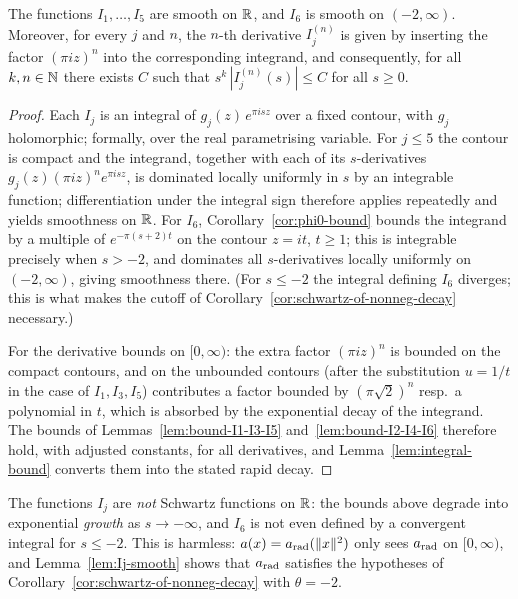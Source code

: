 \begin{lemma}\label{lem:Ij-smooth}
    The functions $I_1, \ldots, I_5$ are smooth on $\mathbb{R}$, and $I_6$ is smooth on $(-2, \infty)$. Moreover, for every $j$ and $n$, the $n$-th derivative $I_j^{(n)}$ is given by inserting the factor $(\pi i z)^n$ into the corresponding integrand, and consequently, for all $k, n \in \mathbb{N}$ there exists $C$ such that $s^k\, |I_j^{(n)}(s)| \leq C$ for all $s \geq 0$.
\end{lemma}
\begin{proof}
    Each $I_j$ is an integral of $g_j(z)\, e^{\pi i s z}$ over a fixed contour, with $g_j$ holomorphic; formally, over the real parametrising variable. For $j \leq 5$ the contour is compact and the integrand, together with each of its $s$-derivatives $g_j(z) (\pi i z)^n e^{\pi i s z}$, is dominated locally uniformly in $s$ by an integrable function; differentiation under the integral sign therefore applies repeatedly and yields smoothness on $\mathbb{R}$. For $I_6$, Corollary~\ref{cor:phi0-bound} bounds the integrand by a multiple of $e^{-\pi(s+2)t}$ on the contour $z = it$, $t \geq 1$; this is integrable precisely when $s > -2$, and dominates all $s$-derivatives locally uniformly on $(-2, \infty)$, giving smoothness there. (For $s \leq -2$ the integral defining $I_6$ diverges; this is what makes the cutoff of Corollary~\ref{cor:schwartz-of-nonneg-decay} necessary.)

    For the derivative bounds on $[0, \infty)$: the extra factor $(\pi i z)^n$ is bounded on the compact contours, and on the unbounded contours (after the substitution $u = 1/t$ in the case of $I_1, I_3, I_5$) contributes a factor bounded by $(\pi\sqrt{2})^n$ resp.\ a polynomial in $t$, which is absorbed by the exponential decay of the integrand. The bounds of Lemmas~\ref{lem:bound-I1-I3-I5} and~\ref{lem:bound-I2-I4-I6} therefore hold, with adjusted constants, for all derivatives, and Lemma~\ref{lem:integral-bound} converts them into the stated rapid decay.
\end{proof}

The functions $I_j$ are \emph{not} Schwartz functions on $\mathbb{R}$: the bounds above degrade into exponential \emph{growth} as $s \to -\infty$, and $I_6$ is not even defined by a convergent integral for $s \leq -2$. This is harmless: $a(x) = a_{\mathrm{rad}}(\|x\|^2)$ only sees $a_{\mathrm{rad}}$ on $[0, \infty)$, and Lemma~\ref{lem:Ij-smooth} shows that $a_{\mathrm{rad}}$ satisfies the hypotheses of Corollary~\ref{cor:schwartz-of-nonneg-decay} with $\theta = -2$.

